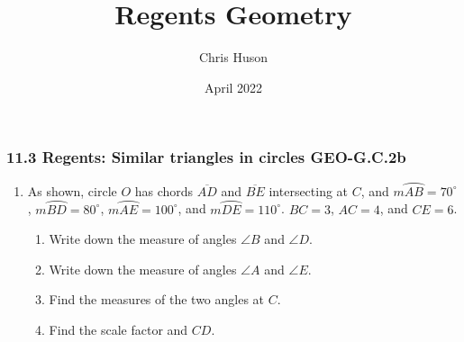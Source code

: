 \documentclass[12pt, oneside]{article}
\title{Regents Geometry}
\author{Chris Huson}
\date{April 2022}
\begin{document}
\subsubsection*{11.3 Regents: Similar triangles in circles \hfill GEO-G.C.2b}
\begin{enumerate}[itemsep=1.7cm]
\item As shown, circle $O$ has chords $\overline{AD}$ and $\overline{BE}$ intersecting at $C$, and $m \wideparen{AB}=70^\circ$, $m \wideparen{BD}=80^\circ$, $m \wideparen{AE}=100^\circ$, and $m \wideparen{DE}=110^\circ$. $BC=3$, $AC=4$, and $CE=6$.
  \begin{multicols}{2}
  \raggedcolumns
  \begin{flushright}
  \end{flushright}
  \begin{enumerate}
    \item Write down the measure of angles $\angle B$ and $\angle D$. \vspace{0.5cm}
    \item Write down the measure of angles $\angle A$ and $\angle E$. \vspace{0.5cm}
    \item Find the measures of the two angles at $C$. \vspace{1.5cm}
    \item Find the scale factor and $CD$.
    \end{enumerate}
  \end{multicols}
  \vspace{1cm}


\end{enumerate}
\end{document}
